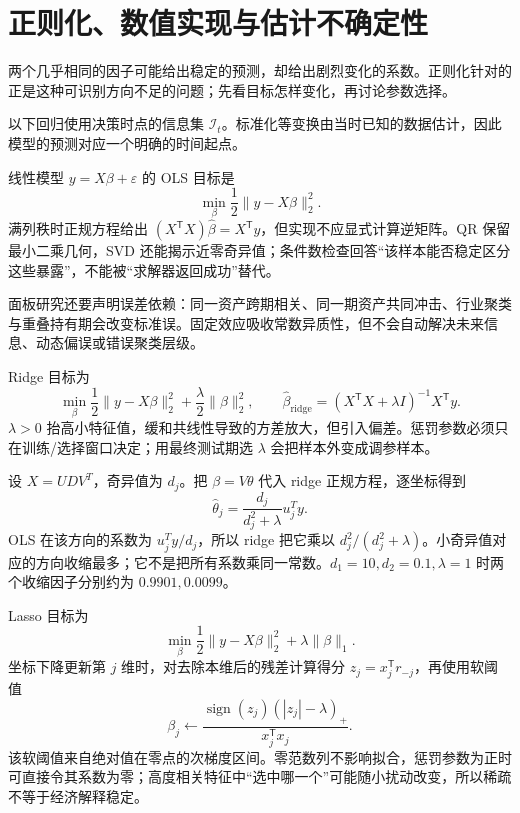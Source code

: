 \section{正则化、数值实现与估计不确定性}
\label{ch:lower-multifactor-estimation}

\begin{itemize}
  
\end{itemize}

两个几乎相同的因子可能给出稳定的预测，却给出剧烈变化的系数。正则化针对的正是这种可识别方向不足的问题；先看目标怎样变化，再讨论参数选择。




以下回归使用决策时点的信息集 $\mathcal I_t$。标准化等变换由当时已知的数据估计，因此模型的预测对应一个明确的时间起点。

线性模型 $y=X\beta+\varepsilon$ 的 OLS 目标是
\[
\min_\beta \frac12\lVert y-X\beta\rVert_2^2.
\]
满列秩时正规方程给出 $(X^{\mathsf T}X)\hat\beta=X^{\mathsf T}y$，但实现不应显式计算逆矩阵。QR 保留最小二乘几何，SVD 还能揭示近零奇异值；条件数检查回答“该样本能否稳定区分这些暴露”，不能被“求解器返回成功”替代。

面板研究还要声明误差依赖：同一资产跨期相关、同一期资产共同冲击、行业聚类与重叠持有期会改变标准误。固定效应吸收常数异质性，但不会自动解决未来信息、动态偏误或错误聚类层级。


Ridge 目标为
\[
\min_\beta \frac12\lVert y-X\beta\rVert_2^2+\frac\lambda2\lVert\beta\rVert_2^2,
\qquad
\hat\beta_{\mathrm{ridge}}=(X^{\mathsf T}X+\lambda I)^{-1}X^{\mathsf T}y.
\]
$\lambda>0$ 抬高小特征值，缓和共线性导致的方差放大，但引入偏差\cite{hoerl1970ridge}。惩罚参数必须只在训练/选择窗口决定；用最终测试期选 $\lambda$ 会把样本外变成调参样本。

设 $X=UDV^T$，奇异值为 $d_j$。把 $\beta=V\theta$ 代入 ridge 正规方程，逐坐标得到
\[
 \hat\theta_j=\frac{d_j}{d_j^2+\lambda}u_j^Ty.
\]
OLS 在该方向的系数为 $u_j^Ty/d_j$，所以 ridge 把它乘以 $d_j^2/(d_j^2+\lambda)$。小奇异值对应的方向收缩最多；它不是把所有系数乘同一常数。$d_1=10,d_2=0.1,\lambda=1$ 时两个收缩因子分别约为 $0.9901,0.0099$。


Lasso 目标为
\[
\min_\beta \frac12\lVert y-X\beta\rVert_2^2+\lambda\lVert\beta\rVert_1.
\]
坐标下降更新第 $j$ 维时，对去除本维后的残差计算得分 $z_j=x_j^{\mathsf T}r_{-j}$，再使用软阈值
\[
\beta_j\leftarrow\frac{\operatorname{sign}(z_j)(|z_j|-\lambda)_+}{x_j^{\mathsf T}x_j}.
\]
该软阈值来自绝对值在零点的次梯度区间\cite{tibshirani1996regression}。零范数列不影响拟合，惩罚参数为正时可直接令其系数为零；高度相关特征中“选中哪一个”可能随小扰动改变，所以稀疏不等于经济解释稳定。

